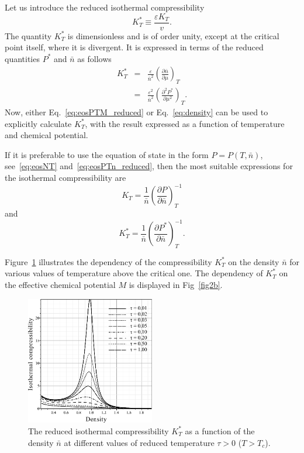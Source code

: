 \documentclass[12pt]{article}
\begin{document}
	Let us introduce the reduced isothermal compressibility
	\begin{equation}
		K^*_T \equiv \frac{\varepsilon K_T}{v}.
	\end{equation}
	The quantity $K^*_T$ is dimensionless and is of order unity, except at the critical point itself, where it is divergent. It is expressed in terms of the reduced quantities $P^*$ and $\bar{n}$ as follows
	\begin{eqnarray}
		K^*_T & = & \frac{\varepsilon}{\bar{n}^2} \left(\frac{\partial \bar{n}}{\partial \mu}\right)_T
		\nonumber\\
		& = & \frac{\varepsilon^2}{\bar{n}^2} \left(\frac{\partial^2 P^*}{\partial \mu^2}\right)_T.
	\end{eqnarray}
	Now, either Eq.~\eqref{eq:eosPTM_reduced} or Eq.~\eqref{eq:density} can be used to explicitly calculate $K^*_T$, with the result expressed as a function of temperature and chemical potential.
	
	If it is preferable to use the equation of state in the form $P=P(T, \bar{n})$, see~\eqref{eq:eosNT} and~\eqref{eq:eosPTn_reduced}, then the most suitable expressions for the isothermal compressibility are
	\begin{equation}
		K_T = \frac{1}{\bar{n}} \left(\frac{\partial P}{\partial \bar{n}}\right)^{-1}_T
	\end{equation}
	and 
	\begin{equation}
		K^*_T = \frac{1}{\bar{n}} \left(\frac{\partial P^*}{\partial \bar{n}}\right)^{-1}_T.
	\end{equation}
	
	Figure~\ref{fig2a} illustrates the dependency of the compressibility $K^*_T$ on the density $\bar{n}$ for various values of temperature above the critical one. The dependency of $K^*_T$ on the effective chemical potential $M$ is displayed in Fig~\ref{fig2b}.
	
	\begin{figure}[h!]
		\centering \includegraphics[width=0.5\textwidth]{f2a.pdf}
		\vskip-3mm\caption{The reduced isothermal compressibility $K^*_T$ as a function of the density $\bar n$ at different values of reduced temperature $\tau > 0$ ($T > T_c$). 
		}\label{fig2a}
	\end{figure}
	
\end{document}
